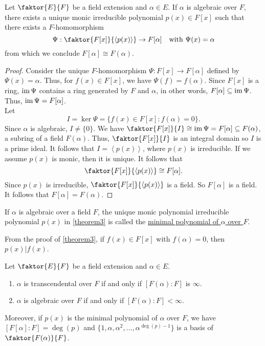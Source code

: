 \documentclass[11pt]{article}
\newcommand{\cyclic}[1]{\left\langle #1 \right\rangle}
\newcommand{\quotient}[2]{\faktor{#1}{#2}}
\begin{document}
\begin{theorem} \label{theorem3}
Let $\quotient{E}{F}$ be a field extension and $\alpha \in E$. If $\alpha$ is algebraic over
$F$, there exists a unique monic irreducible polynomial $p(x) \in F[x]$ such
that there exists a $F$-homomorphism
\begin{equation*}
\Psi:\quotient{F[x]}{\cyclic{p(x)}} \to F[\alpha] \quad \text{with } \Psi(x) = \alpha
\end{equation*}
from which we conclude $F[\alpha] \cong F(\alpha)$.
\end{theorem}
\begin{proof}
Consider the unique $F$-homomorphism $\Psi: F[x] \to F[\alpha]$ defined by
$\Psi(x) = \alpha$. Thus, for $f(x) \in F[x]$, we have $\Psi(f) = f(\alpha)$.
Since $F[x]$ is a ring, $\operatorname{im}\Psi$ contains a ring generated by $F$ and
$\alpha$, in other words, $F[\alpha] \subseteq \operatorname{im}\Psi$. Thus, $\operatorname{im}\Psi =
F[\alpha]$.\\
Let
\begin{equation*}
I = \ker\Psi = \{f(x) \in F[x] : f(\alpha) = 0 \}.
\end{equation*}
Since $\alpha$ is algebraic, $I \neq \{0\}$. We have $\quotient{F[x]}{I} \cong
\im\Psi = F[\alpha] \subseteq F(\alpha)$, a subring of a field $F(\alpha)$. Thus,
$\quotient{F[x]}{I}$ is an integral domain so $I$ is a prime ideal. It follows that
$I = \cyclic{p(x)}$, where $p(x)$ is irreducible. If we assume $p(x)$ is
monic, then it is unique. It follows that
\begin{equation*}
\quotient{F[x]}{\cyclic{p(x)}}\cong F[\alpha].
\end{equation*}
Since $p(x)$ is irreducible, $\quotient{F[x]}{\cyclic{p(x)}}$ is a field. So
$F[\alpha]$ is a field. It follows that $F[\alpha] = F(\alpha)$.
\end{proof}
\begin{definition}
If $\alpha$ is algebraic over a field $F$, the unique monic polynomial
irreducible polynomial $p(x)$ in \cref{theorem3} is called the \underline{minimal
polynomial of $\alpha$ over $F$}.
\end{definition}
\begin{remark}
From the proof of \cref{theorem3}, if $f(x) \in F[x]$ with $f(\alpha) = 0$, then
$p(x) \big| f(x)$.
\end{remark}
\begin{theorem} \label{theorem4}
Let $\quotient{E}{F}$ be a field extension and $\alpha \in E$.
\begin{enumerate}
\item $\alpha$ is transcendental over $F$ if and only if $[F(\alpha):F]$ is
$\infty$.
\item $\alpha$ is algebraic over $F$ if and only if $[F(\alpha):F] < \infty$.
\end{enumerate}
Moreover, if $p(x)$ is the minimal polynomial of $\alpha$ over $F$, we have
$[F[\alpha]:F] = \deg(p)$ and $\{1, \alpha, \alpha^2, \dots,
\alpha^{\deg (p) - 1}\}$ is a basis of $\quotient{F(\alpha)}{F}$.
\end{theorem}
\end{document}
